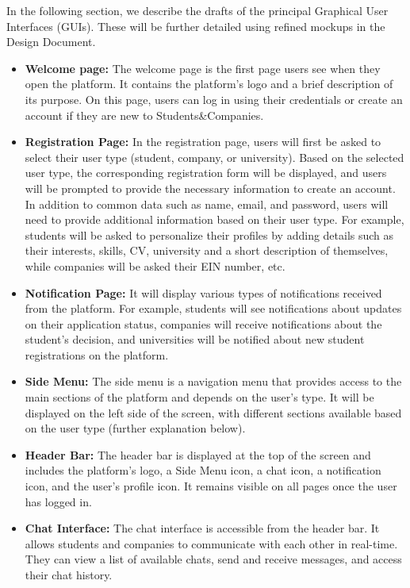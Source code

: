 In the following section, we describe the drafts of the principal Graphical User Interfaces (GUIs). These will be further detailed
using refined mockups in the Design Document.
\begin{itemize}
    \item \textbf{Welcome page:} The welcome page is the first page users see when they open the platform. It contains the platform's logo 
    and a brief description of its purpose. On this page, users can log in using their credentials or create an account if they are new
    to Students\&Companies.
    
    \item \textbf{Registration Page:} In the registration page, users will first be asked to select their user type (student, company, or
     university). Based on the selected user type, the corresponding registration form will be displayed, and users will be prompted to 
     provide the necessary information to create an account. In addition to common data such as name, email, and password, users will
     need to provide additional information based on their user type. For example, students will be asked to personalize their profiles by 
     adding details such as their interests, skills, CV, university and a short description of themselves, while companies will be 
     asked their EIN number, etc.
    
    \item \textbf{Notification Page:} It will display various types of notifications received from the platform. For example, students will
    see notifications about updates on their application status, companies will receive notifications about the student’s decision, and 
    universities will be notified about new student registrations on the platform.

    \item \textbf{Side Menu:} The side menu is a navigation menu that provides access to the main sections of the platform and depends on the
    user's type. It will be displayed on the left side of the screen, with different sections available based on the user type (further explanation 
    below).

    \item \textbf{Header Bar:} The header bar is displayed at the top of the screen and includes the platform's logo, a Side Menu icon, a chat 
    icon, a notification icon, and the user's profile icon. It remains visible on all pages once the user has logged in.

    \item \textbf{Chat Interface:} The chat interface is accessible from the header bar. It allows students and companies to communicate with 
    each other in real-time. They can view a list of available chats, send and receive messages, and access their chat history.


\end{itemize}

